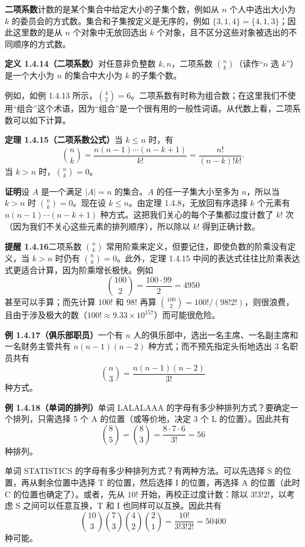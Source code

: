 \documentclass[UTF8,12pt,a4paper,fontset=fandol]{ctexart}
\begin{document}
\textbf{二项系数}计数的是某个集合中给定大小的子集个数，例如从 $n$ 个人中选出大小为 $k$ 的委员会的方式数。集合和子集按定义是无序的，例如 $\{3,1,4\}=\{4,1,3\}$；因此这里数的是从 $n$ 个对象中无放回选出 $k$ 个对象，且不区分这些对象被选出的不同顺序的方式数。

\noindent\textbf{定义 1.4.14（二项系数）}\quad 对任意非负整数 $k,n$，二项系数 $\binom{n}{k}$（读作“$n$ 选 $k$”）是一个大小为 $n$ 的集合中大小为 $k$ 的子集个数。

例如，如例 1.4.13 所示，$\binom42=6$。二项系数有时称为组合数；在这里我们不使用“组合”这个术语，因为“组合”是一个很有用的一般性词语。从代数上看，二项系数可以如下计算。

\noindent\textbf{定理 1.4.15（二项系数公式）}\quad 当 $k\le n$ 时，有
\[
  \binom{n}{k}
  =\frac{n(n-1)\cdots(n-k+1)}{k!}
  =\frac{n!}{(n-k)!k!}.
\]
当 $k>n$ 时，$\binom{n}{k}=0$。

\noindent\textbf{证明}\quad 设 $A$ 是一个满足 $|A|=n$ 的集合。$A$ 的任一子集大小至多为 $n$，所以当 $k>n$ 时 $\binom{n}{k}=0$。现在设 $k\le n$。由定理 1.4.8，无放回有序选择 $k$ 个元素有 $n(n-1)\cdots(n-k+1)$ 种方式。这把我们关心的每个子集都过度计数了 $k!$ 次（因为我们不关心这些元素的排列顺序），所以除以 $k!$ 得到正确计数。

\noindent\textbf{提醒 1.4.16}\quad 二项系数 $\binom{n}{k}$ 常用阶乘来定义，但要记住，即使负数的阶乘没有定义，当 $k>n$ 时仍有 $\binom{n}{k}=0$。此外，定理 1.4.15 中间的表达式往往比阶乘表达式更适合计算，因为阶乘增长极快。例如
\[
  \binom{100}{2}=\frac{100\cdot 99}{2}=4950
\]
甚至可以手算；而先计算 $100!$ 和 $98!$ 再算 $\binom{100}{2}=100!/(98!2!)$，则很浪费，且由于涉及极大的数（$100!\approx 9.33\times 10^{157}$）而可能很危险。

\noindent\textbf{例 1.4.17（俱乐部职员）}\quad 一个有 $n$ 人的俱乐部中，选出一名主席、一名副主席和一名财务主管共有 $n(n-1)(n-2)$ 种方式；而不预先指定头衔地选出 3 名职员共有
\[
  \binom{n}{3}=\frac{n(n-1)(n-2)}{3!}
\]
种方式。

\noindent\textbf{例 1.4.18（单词的排列）}\quad 单词 LALALAAA 的字母有多少种排列方式？要确定一个排列，只需选择 5 个 A 的位置（或等价地，决定 3 个 L 的位置）。因此共有
\[
  \binom85=\binom83=\frac{8\cdot 7\cdot 6}{3!}=56
\]
种排列。

单词 STATISTICS 的字母有多少种排列方式？有两种方法。可以先选择 S 的位置，再从剩余位置中选择 T 的位置，然后选择 I 的位置，再选择 A 的位置（此时 C 的位置也确定了）。或者，先从 $10!$ 开始，再校正过度计数：除以 $3!3!2!$，以考虑 S 之间可以任意互换，T 和 I 也同样可以互换。因此共有
\[
  \binom{10}{3}\binom73\binom42\binom21
  =\frac{10!}{3!3!2!}=50400
\]
种可能。
\end{document}
